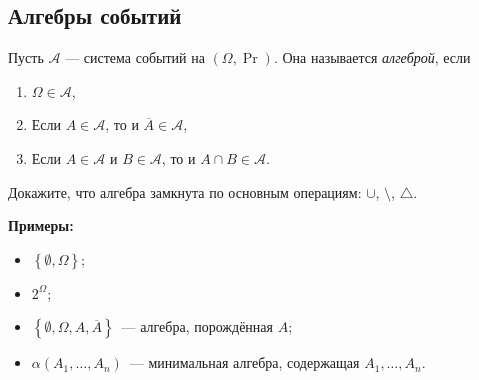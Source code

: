 \subsection{Алгебры событий}
\begin{definition}
    Пусть $\mathcal{A}$ --- система событий на $(\Omega, \Pr)$. Она называется \emph{алгеброй}, если
    \begin{enumerate}
        \item \(\Omega \in \mathcal{A}\),
        \item Если \(A \in \mathcal{A}\), то и \(\overline{A} \in \mathcal{A}\),
        \item Если \(A \in \mathcal{A}\) и \(B \in \mathcal{A}\), то и \(A \cap B \in \mathcal{A}\).
    \end{enumerate}
\end{definition}

\begin{exercise}
    Докажите, что алгебра замкнута по основным операциям: \(\cup\), \(\setminus\), \(\triangle\).
\end{exercise}

\noindent\textbf{Примеры:}

\begin{itemize}
    \item \(\left\{ \emptyset, \Omega \right\}\);
    \item \(2^{\Omega}\);
    \item \(\left\{ \emptyset, \Omega, A, \overline{A}\right\}\)~--- алгебра, порождённая \(A\);
    \item \(\alpha\left( A_1, \ldots, A_n \right)\)~--- минимальная алгебра, содержащая \(A_1, \dots, A_n\).
\end{itemize}